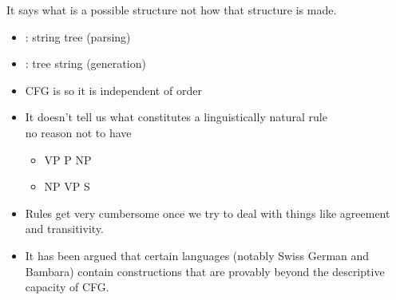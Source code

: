 \documentclass[a4paper,landscape,headrule,footrule]{foils}
\begin{document}
\begin{center} \ctree{[S [NP] [VP]]} \end{center}

\begin{center}  \end{center}

\begin{center}  \end{center}

\begin{center}  \end{center}

\begin{center}
\end{center}

It says what is a possible structure not how that structure is made.

\begin{itemize}
\item {}: string \into tree  (parsing)
\item {}: tree \into string  (generation)
\item CFG is  so it is independent of order
\end{itemize}

\begin{itemize}
\item It doesn’t tell us what constitutes a linguistically
  natural rule
  \\ no reason not to have
\begin{itemize}
\item VP \into P NP
\item NP \into VP S
\end{itemize}
\item Rules get very cumbersome once we try to deal
with things like agreement and transitivity.
\item It has been argued that certain languages (notably
Swiss German and Bambara) contain constructions
that are provably beyond the descriptive capacity of
CFG.
\end{itemize}
\end{document}
